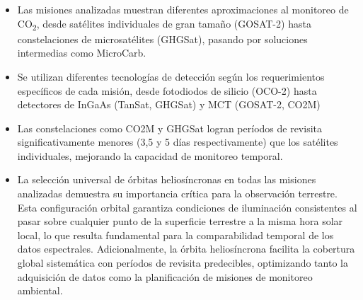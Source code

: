 \begin{itemize}
    \item Las misiones analizadas muestran diferentes aproximaciones al monitoreo de CO\textsubscript{2}, desde satélites individuales de gran tamaño (GOSAT-2) hasta constelaciones de microsatélites (GHGSat), pasando por soluciones intermedias como MicroCarb.
    \item Se utilizan diferentes tecnologías de detección según los requerimientos específicos de cada misión, desde fotodiodos de silicio (OCO-2) hasta detectores de InGaAs (TanSat, GHGSat) y MCT (GOSAT-2, CO2M)
    \item Las constelaciones como CO2M y GHGSat logran períodos de revisita significativamente menores (3,5 y 5 días respectivamente) que los satélites individuales, mejorando la capacidad de monitoreo temporal.
    \item La selección universal de órbitas heliosíncronas en todas las misiones analizadas demuestra su importancia crítica para la observación terrestre. Esta configuración orbital garantiza condiciones de iluminación consistentes al pasar sobre cualquier punto de la superficie terrestre a la misma hora solar local, lo que resulta fundamental para la comparabilidad temporal de los datos espectrales. Adicionalmente, la órbita heliosíncrona facilita la cobertura global sistemática con períodos de revisita predecibles, optimizando tanto la adquisición de datos como la planificación de misiones de monitoreo ambiental.

\end{itemize}